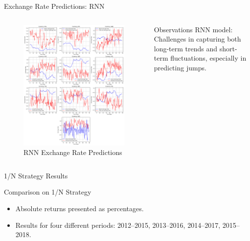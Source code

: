 \documentclass{beamer}
\begin{document}
\begin{frame}{Exchange Rate Predictions: RNN}
    \begin{columns}[T,onlytextwidth]
        \begin{figure}[ht]
            \centering
            \includegraphics[width=\textwidth]{figure/rnn_exchange_rate_predictions.png}
            \caption{RNN Exchange Rate Predictions}
            \label{figure:rnn_predictions}
        \end{figure}

        \begin{block}{Observations}
            RNN model: Challenges in capturing both long-term trends and short-term fluctuations, especially in predicting jumps.
        \end{block}
    \end{columns}
\end{frame}

\begin{frame}{1/N Strategy Results}
    \begin{alertblock}{Comparison on 1/N Strategy}
        \begin{itemize}
            \item Absolute returns presented as percentages.
            \item Results for four different periods: 2012–2015, 2013–2016, 2014–2017, 2015–2018.
        \end{itemize}
    \end{alertblock}
\end{frame}
\end{document}
